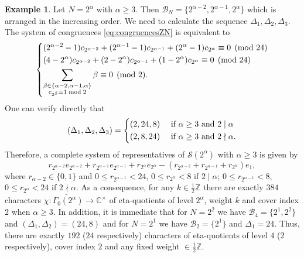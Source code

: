 \documentclass[12pt]{amsart}
\numberwithin{equation}{section}
\theoremstyle{plain}
\theoremstyle{definition}
\newtheorem{examp}[thm]{Example}
\theoremstyle{remark}
\newcommand\twoscript[2]{\substack{{#1} \\ {#2}}}
\newcommand\numZ{\mathbb{Z}}
\newcommand\numC{\mathbb{C}}
\begin{document}
\begin{examp}
\label{examp:classifyChar2}
Let $N=2^\alpha$ with $\alpha \geq3$. Then $\mathscr{B}_N=\{2^{\alpha-2},2^{\alpha-1},2^{\alpha}\}$ which is arranged in the increasing order. We need to calculate the sequence $\Delta_1,\Delta_2,\Delta_3$. The system of congruences \eqref{eq:congruencesZN} is equivalent to
\begin{equation*}
\begin{dcases}
(2^{\alpha-2}-1)c_{2^{\alpha-2}}+(2^{\alpha-1}-1)c_{2^{\alpha-1}}+(2^{\alpha}-1)c_{2^{\alpha}}\equiv0\pmod{24}\\
(4-2^{\alpha})c_{2^{\alpha-2}}+(2-2^{\alpha})c_{2^{\alpha-1}}+(1-2^{\alpha})c_{2^{\alpha}}\equiv0\pmod{24}\\
\sum_{\twoscript{\beta\in\{\alpha-2,\alpha-1,\alpha\}}{c_{2^\beta}\equiv1\bmod 2}}\beta\equiv0\pmod{2}.
\end{dcases}
\end{equation*}
One can verify directly that
\begin{equation*}
(\Delta_1,\Delta_2,\Delta_3)=\begin{dcases}
(2,24,8)  &\text{ if }\alpha\geq3\text{ and }2\mid\alpha\\
(2,8,24)  &\text{ if }\alpha\geq3\text{ and }2\nmid\alpha.
\end{dcases}
\end{equation*}
Therefore, a complete system of representatives of $\mathscr{S}(2^\alpha)$ with $\alpha\geq3$ is given by
\begin{equation*}
r_{2^{\alpha-2}}e_{2^{\alpha-2}}+r_{2^{\alpha-1}}e_{2^{\alpha-1}}+r_{2^{\alpha}}e_{2^{\alpha}}-(r_{2^{\alpha-2}}+r_{2^{\alpha-1}}+r_{2^{\alpha}})e_1,
\end{equation*}
where $r_{\alpha-2}\in\{0,1\}$ and $0\leq r_{2^{\alpha-1}}<24$, $0\leq r_{2^{\alpha}}<8$ if $2\mid\alpha$; $0\leq r_{2^{\alpha-1}}<8$, $0\leq r_{2^{\alpha}}<24$ if $2\nmid\alpha$. As a consequence, for any $k\in\frac{1}{2}\numZ$ there are exactly $384$ characters $\chi\colon\widetilde{\Gamma_0(2^\alpha)}\to\numC^\times$ of eta-quotients of level $2^\alpha$, weight $k$ and cover index $2$ when $\alpha\geq3$. In addition, it is immediate that for $N=2^2$ we have $\mathscr{B}_{4}=\{2^1,2^2\}$ and $(\Delta_1,\Delta_2)=(24,8)$ and for $N=2^1$ we have $\mathscr{B}_{2}=\{2^1\}$ and $\Delta_1=24$. Thus, there are exactly $192$ ($24$ respectively) characters of eta-quotients of level $4$ ($2$ respectively), cover index $2$ and any fixed weight $\in\frac{1}{2}\numZ$.
\end{examp}
\end{document}
